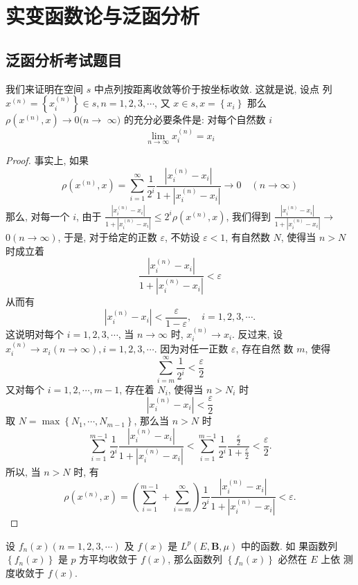 \chapter{实变函数论与泛函分析}
\section{泛函分析考试题目}
\begin{example}
    我们来证明在空间 $s$ 中点列按距离收敛等价于按坐标收敛. 这就是说, 设点 列 $x^{(n)}=\left\{x_i^{(n)}\right\} \in s, n=1,2,3, \cdots$, 又 $x \in s, x=\left\{x_i\right\}$ 那么 $\rho\left(x^{(n)}, x\right) \rightarrow 0(n \rightarrow$ $\infty)$ 的充分必要条件是: 对每个自然数 $i$
$$
\lim _{n \rightarrow \infty} x_i^{(n)}=x_i
$$
\end{example}

\begin{proof}
事实上, 如果
$$
\rho\left(x^{(n)}, x\right)=\sum_{i=1}^{\infty} \frac{1}{2^i} \frac{\left|x_i^{(n)}-x_i\right|}{1+\left|x_i^{(n)}-x_i\right|} \rightarrow 0 \quad(n \rightarrow \infty)
$$
那么, 对每一个 $i$, 由于 $\frac{\left|x_i^{(n)}-x_i\right|}{1+\left|x_i^{(n)}-x_i\right|} \leqslant 2^i \rho\left(x^{(n)}, x\right)$, 我们得到 $\frac{\left|x_i^{(n)}-x_i\right|}{1+\left|x_i^{(n)}-x_i\right|} \rightarrow$ $0(n \rightarrow \infty)$, 于是, 对于给定的正数 $\varepsilon$, 不妨设 $\varepsilon<1$, 有自然数 $N$, 使得当 $n>N$ 时成立着
$$
\frac{\left|x_i^{(n)}-x_i\right|}{1+\left|x_i^{(n)}-x_i\right|}<\varepsilon
$$
从而有
$$
\left|x_i^{(n)}-x_i\right|<\frac{\varepsilon}{1-\varepsilon}, \quad i=1,2,3, \cdots .
$$
这说明对每个 $i=1,2,3, \cdots$, 当 $n \rightarrow \infty$ 时, $x_i^{(n)} \rightarrow x_i$.
反过来, 设 $x_i^{(n)} \rightarrow x_i(n \rightarrow \infty), i=1,2,3, \cdots$. 因为对任一正数 $\varepsilon$, 存在自然 数 $m$, 使得
$$
\sum_{i=m}^{\infty} \frac{1}{2^i}<\frac{\varepsilon}{2}
$$
又对每个 $i=1,2, \cdots, m-1$, 存在着 $N_i$, 使得当 $n>N_i$ 时
$$
\left|x_i^{(n)}-x_i\right|<\frac{\varepsilon}{2}
$$
取 $N=\max \left\{N_1, \cdots, N_{m-1}\right\}$, 那么当 $n>N$ 时
$$
\sum_{i=1}^{m-1} \frac{1}{2^i} \frac{\left|x_i^{(n)}-x_i\right|}{1+\left|x_i^{(n)}-x_i\right|}<\sum_{i=1}^{m-1} \frac{1}{2^i} \frac{\frac{\varepsilon}{2}}{1+\frac{\varepsilon}{2}}<\frac{\varepsilon}{2} .
$$
所以, 当 $n>N$ 时, 有
$$
\rho\left(x^{(n)}, x\right)=\left(\sum_{i=1}^{m-1}+\sum_{i=m}^{\infty}\right) \frac{1}{2^i} \frac{\left|x_i^{(n)}-x_i\right|}{1+\left|x_i^{(n)}-x_i\right|}<\varepsilon .
$$
\end{proof}


\begin{example}
 设 $f_n(x)(n=1,2,3, \cdots)$ 及 $f(x)$ 是 $L^p(E, \boldsymbol{B}, \mu)$ 中的函数. 如 果函数列 $\left\{f_n(x)\right\}$ 是 $p$ 方平均收敛于 $f(x)$, 那么函数列 $\left\{f_n(x)\right\}$ 必然在 $E$ 上依 测度收敛于 $f(x)$.

\end{example}

